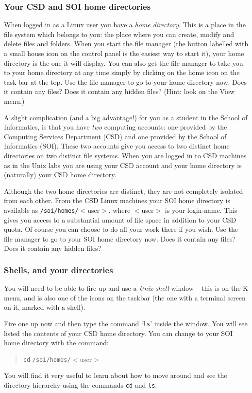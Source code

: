 \documentclass{article}
\newcommand{\fname}[1]{\texttt{#1}}
\begin{document}
\subsubsection*{Your CSD and SOI home directories}

When logged in as a Linux user you have a \emph{home directory}.
This is a place in the file system which belongs to you: the place where
you can create, modify and delete files and folders. When you start
the file manager (the button labelled with a small house icon on the control
panel is the easiest way to start it), your home directory is the one it will
display. You can also get the file manager to take you to your
home directory at any time simply by clicking on the home icon
on the task bar at the top.
Use the file manager to go to your home directory now.
Does it contain any files? Does it contain any hidden files?
(Hint: look on the {\sf View} menu.)

A slight complication (and a big advantage!)
for you as a student in the School of Informatics,
is that you have \emph{two} computing accounts: one provided by the
Computing Services Department (CSD) and one provided by
the School of Informatics (SOI). These two accounts give you access to
two distinct home directories on two distinct file systems. When you
are logged in to CSD machines as in the Unix labs
you are using your CSD account
and your home directory is (naturally) your CSD home directory.

Although the two home directories are distinct, they are not
completely isolated from each other.
From the CSD Linux machines your SOI home directory
is available as \fname{/soi/homes/}$<${\sc user}$>$, 
where $<${\sc user}$>$ is your login-name. 
This gives you access to a substantial
amount of file space in addition to your CSD quota.
Of course you can choose to do all your work there if you wish.
Use the file manager to go to your SOI home directory now.
Does it contain any files? Does it contain any hidden files?


\subsubsection*{Shells, and your directories}
You will need to be able to fire up and use a \emph{Unix shell} window -- this is on the K menu, 
and is also one of the icons on the taskbar (the one with a 
terminal screen on it, marked with a shell). 

Fire one up now and then type
the command `\verb+ls+' inside the window. 
You will see listed the contents of your CSD home directory. 
You can change to your SOI home directory with the 
command:
\begin{quote}
{\tt cd} \fname{/soi/homes/}$<${\sc user}$>$
\end{quote}
You will find it very useful to learn about how to
move around and see the directory hierarchy using
the commands \verb+cd+ and \verb+ls+.
\end{document}
